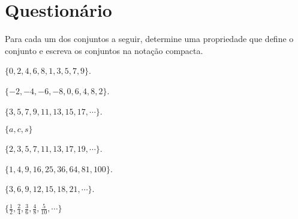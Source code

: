 


\section{Questionário}\label{sec:Questionario1part1}

\begin{questao}\label{test:Conjuntos1}
	Para cada um dos conjuntos a seguir, determine uma propriedade que define o conjunto e escreva os conjuntos na notação compacta.
\end{questao}

\begin{exerList}
	\item $\{0,2,4,6,8,1,3,5,7,9\}$.
	\item $\{-2, -4, -6, -8, 0, 6, 4, 8, 2\}$.
	\item $\{3, 5, 7, 9, 11, 13, 15, 17, \cdots\}$.
	\item $\{a, c, s\}$
	\item $\{2, 3, 5, 7, 11, 13, 17, 19, \cdots\}$.
	\item $\{1, 4, 9, 16, 25, 36, 64, 81, 100\}$.
	\item $\{3, 6, 9, 12, 15, 18, 21, \cdots\}$.
	\item $\Big\{\frac{1}{2}, \frac{2}{4}, \frac{3}{6}, \frac{4}{8}, \frac{5}{10}, \cdots\Big\}$
\end{exerList}

